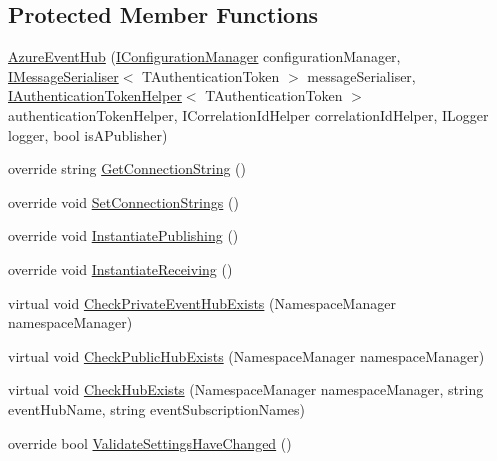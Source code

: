 \subsection*{Protected Member Functions}
\begin{DoxyCompactItemize}
\item 
\hyperlink{classCqrs_1_1Azure_1_1ServiceBus_1_1AzureEventHub_adef2c26639ae4a7725c397da7fd90000}{Azure\+Event\+Hub} (\hyperlink{interfaceCqrs_1_1Configuration_1_1IConfigurationManager}{I\+Configuration\+Manager} configuration\+Manager, \hyperlink{interfaceCqrs_1_1Azure_1_1ServiceBus_1_1IMessageSerialiser}{I\+Message\+Serialiser}$<$ T\+Authentication\+Token $>$ message\+Serialiser, \hyperlink{interfaceCqrs_1_1Authentication_1_1IAuthenticationTokenHelper}{I\+Authentication\+Token\+Helper}$<$ T\+Authentication\+Token $>$ authentication\+Token\+Helper, I\+Correlation\+Id\+Helper correlation\+Id\+Helper, I\+Logger logger, bool is\+A\+Publisher)
\item 
override string \hyperlink{classCqrs_1_1Azure_1_1ServiceBus_1_1AzureEventHub_a9855633b53ed1f67863ef9dffad0812c}{Get\+Connection\+String} ()
\item 
override void \hyperlink{classCqrs_1_1Azure_1_1ServiceBus_1_1AzureEventHub_af823e573f3acc3fa9949969499309db1}{Set\+Connection\+Strings} ()
\item 
override void \hyperlink{classCqrs_1_1Azure_1_1ServiceBus_1_1AzureEventHub_a3747fb9fcb3de2a72c8a6d7bbd92db95}{Instantiate\+Publishing} ()
\item 
override void \hyperlink{classCqrs_1_1Azure_1_1ServiceBus_1_1AzureEventHub_aa725781eddb65bdfe456a4fecb36fb6b}{Instantiate\+Receiving} ()
\item 
virtual void \hyperlink{classCqrs_1_1Azure_1_1ServiceBus_1_1AzureEventHub_af43ec28c427d2d45370ef2401864db4b}{Check\+Private\+Event\+Hub\+Exists} (Namespace\+Manager namespace\+Manager)
\item 
virtual void \hyperlink{classCqrs_1_1Azure_1_1ServiceBus_1_1AzureEventHub_ae60a7cddcb566ff8f5cf2ac2db17733e}{Check\+Public\+Hub\+Exists} (Namespace\+Manager namespace\+Manager)
\item 
virtual void \hyperlink{classCqrs_1_1Azure_1_1ServiceBus_1_1AzureEventHub_af9cafb2d7025844b0bf37ee6a6a0f635}{Check\+Hub\+Exists} (Namespace\+Manager namespace\+Manager, string event\+Hub\+Name, string event\+Subscription\+Names)
\item 
override bool \hyperlink{classCqrs_1_1Azure_1_1ServiceBus_1_1AzureEventHub_afe8d6f93f97ab5658b81903af555632c}{Validate\+Settings\+Have\+Changed} ()

\end{DoxyCompactItemize}
